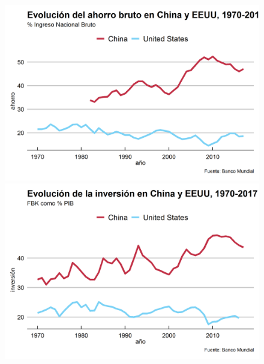 \documentclass{beamer}
\begin{document}
	\begin{frame}[plain]
		\begin{figure}
			\centering
			\begin{minipage}{.5\textwidth}
				\centering
				\includegraphics[width=.9\linewidth, keepaspectratio]{ahorro_70}
			\end{minipage}%
			\begin{minipage}{.5\textwidth}
				\centering
				\includegraphics[width=.9\linewidth, keepaspectratio]{inversion_70}
			\end{minipage}
		\end{figure}
	\end{frame}
\end{document}
